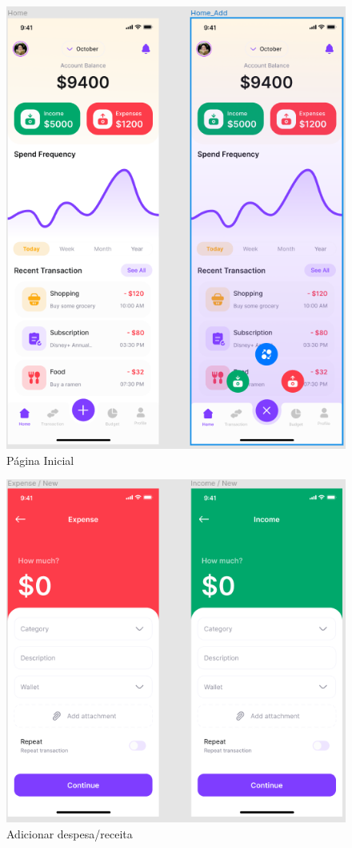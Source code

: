 \begin{figure}[!htb]
    \centering
    \caption{Página Inicial}
    \includegraphics[scale=0.6]{images/home.png}
\end{figure}

\begin{figure}[!htb]
    \centering
    \caption{Adicionar despesa/receita}
    \includegraphics[scale=0.6]{images/receipts.png}
\end{figure}

